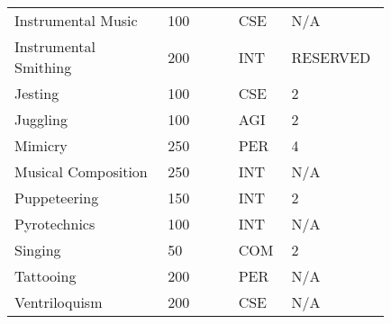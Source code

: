 \documentclass{article}
\begin{document}
\begin{longtable}{@{}p{0.375\linewidth} p{0.178\linewidth} p{0.1\linewidth} p{0.178\linewidth}}
Instrumental Music & 100 & CSE & N/A \\
Instrumental Smithing & 200 & INT & RESERVED \\
Jesting & 100 & CSE & 2 \\
Juggling & 100 & AGI & 2 \\
Mimicry & 250 & PER & 4 \\
Musical Composition & 250 & INT & N/A \\
Puppeteering & 150 & INT & 2 \\
Pyrotechnics & 100 & INT & N/A \\
Singing & 50 & COM & 2 \\
Tattooing & 200 & PER & N/A \\
Ventriloquism & 200 & CSE & N/A \\
\end{longtable}
\end{document}
